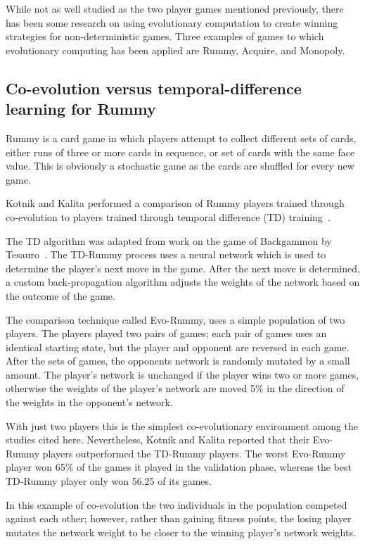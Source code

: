 While not as well studied as the two player games mentioned previously, there
has been some research on using evolutionary computation to create winning
strategies for non-deterministic games. Three examples of games
to which evolutionary computing has been applied are Rummy, Acquire, and Monopoly.

\subsection{Co-evolution versus temporal-difference learning for Rummy}

Rummy is a card game in which players attempt to collect different sets of 
cards, either runs of three or more cards in sequence, or set of cards with the
same face value. This is obviously a stochastic game as the cards are shuffled
for every new game.

Kotnik and Kalita performed a comparison of Rummy players trained through 
co-evolution to players trained through temporal difference (TD) 
training~\cite{kotnik2003significance}.

The TD algorithm was adapted from work on the game of Backgammon by
Tesauro~\cite{tesauro1992practical,Tesauro:1995:TDL:203330.203343}. The TD-Rummy
process uses a neural network which is used to determine the player's next move
in the game. After the next move is determined, a custom back-propagation
algorithm adjusts the weights of the network based on the outcome of the game.

The comparison technique called Evo-Rummy, uses a simple population of two 
players. The players played two pairs of games; each pair of games uses an 
identical starting state, but the player and opponent are reversed in each 
game. After the sets of games, the opponents network is randomly mutated by
a small amount. The player's network is unchanged if the player wins two or
more games, otherwise the weights of the player's network are moved 5\% in
the direction of the weights in the opponent's network.

With just two players this is the simplest co-evolutionary environment among 
the studies cited here. Nevertheless, Kotnik and Kalita reported that their
Evo-Rummy players outperformed the TD-Rummy players. The worst Evo-Rummy player
won 65\% of the games it played in the validation phase, whereas the best 
TD-Rummy player only won 56.25\* of its games.

In this example of co-evolution the two individuals in the population competed
against each other; however, rather than gaining fitness points, the losing
player mutates the network weight to be closer to the winning player's network
weights.

